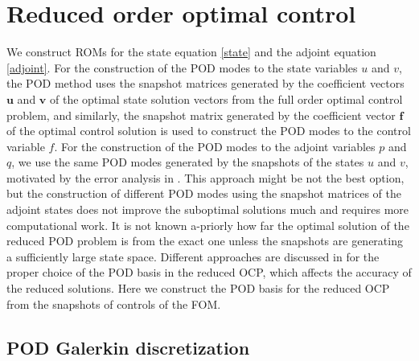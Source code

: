 \documentclass[preprint,12pt]{elsarticle}
\begin{document}
\section{Reduced order optimal control}
\label{rom}

We construct ROMs for the state equation \eqref{state} and the adjoint equation \eqref{adjoint}. For the construction of the POD modes to the state variables $u$ and $v$, the POD method uses the snapshot matrices generated by the coefficient vectors $\bm{u}$ and $\bm{v}$  of the optimal state solution vectors from the full order optimal control problem, and similarly, the snapshot matrix generated by the coefficient vector $\bm{f}$ of the optimal control solution is used to construct the POD modes to the control variable $f$. For the construction of the POD modes to the adjoint variables $p$ and $q$, we use the same POD modes generated by the snapshots of the states $u$ and $v$, motivated by the error analysis in  \cite{Gubisch17}. This approach might be not the best option, but  the construction of different POD modes using the snapshot matrices of the adjoint states does not improve the suboptimal solutions much \cite{Kammann13} and  requires more computational work.
It is not known a-priorly how far the optimal solution
of the reduced POD problem is from the exact one unless the snapshots are generating a sufficiently large state space. Different approaches are discussed  in \cite{Benner14tip} for the proper choice of the POD basis in the reduced OCP, which affects the accuracy of the reduced solutions. Here we construct the POD basis for the reduced OCP from the snapshots of controls of the FOM.


\subsection{POD Galerkin discretization}
\label{podGalerkin}
\end{document}

